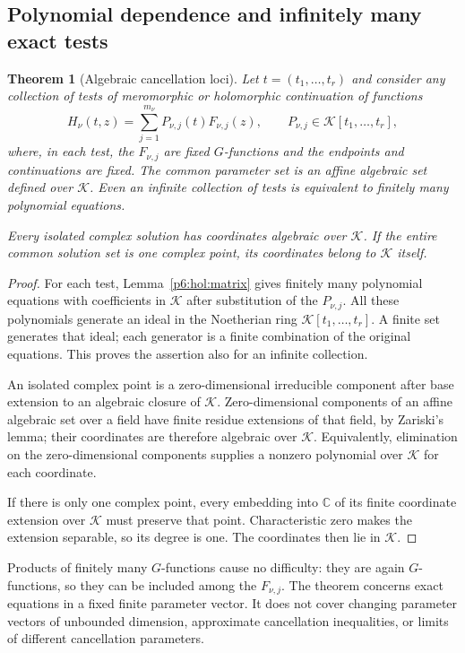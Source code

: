 \documentclass[11pt,a4paper]{article}
\newtheorem{theorem}{Theorem}[section]
\theoremstyle{definition}
\theoremstyle{remark}
\numberwithin{equation}{section}
\begin{document}
\subsection{Polynomial dependence and infinitely many exact tests}

\begin{theorem}[Algebraic cancellation loci]\label{p6:hol:polynomial}
Let $t=(t_1,\ldots,t_r)$ and consider any collection of tests of
meromorphic or holomorphic continuation of functions
\[
 H_\nu(t,z)=\sum_{j=1}^{m_\nu}P_{\nu,j}(t)F_{\nu,j}(z),
 \qquad P_{\nu,j}\in\mathcal K[t_1,\ldots,t_r],
\]
where, in each test, the $F_{\nu,j}$ are fixed $G$-functions and
the endpoints and continuations are fixed.  The common parameter
set is an affine algebraic set defined over $\mathcal K$.
Even an infinite collection of tests is equivalent to finitely
many polynomial equations.

Every isolated complex solution has coordinates algebraic over
$\mathcal K$.  If the entire common solution set is one complex
point, its coordinates belong to $\mathcal K$ itself.
\end{theorem}
\begin{proof}
For each test, Lemma~\ref{p6:hol:matrix} gives finitely many polynomial
equations with coefficients in $\mathcal K$ after substitution
of the $P_{\nu,j}$.  All these polynomials generate an ideal in
the Noetherian ring $\mathcal K[t_1,\ldots,t_r]$.
A finite set generates that ideal; each generator is a finite
combination of the original equations.  This proves the assertion
also for an infinite collection.

An isolated complex point is a zero-dimensional irreducible
component after base extension to an algebraic closure of
$\mathcal K$.  Zero-dimensional components of an affine
algebraic set over a field have finite residue extensions of
that field, by Zariski's lemma; their coordinates are therefore
algebraic over $\mathcal K$.  Equivalently, elimination on the
zero-dimensional components supplies a nonzero polynomial over
$\mathcal K$ for each coordinate.

If there is only one complex point, every embedding into
$\mathbb C$ of its finite coordinate extension over $\mathcal K$
must preserve that point.  Characteristic zero makes the
extension separable, so its degree is one.  The coordinates
then lie in $\mathcal K$.
\end{proof}

Products of finitely many $G$-functions cause no difficulty: they
are again $G$-functions, so they can be included among the $F_{\nu,j}$.
The theorem concerns exact equations in a fixed finite parameter
vector.  It does not cover changing parameter vectors of unbounded
dimension, approximate cancellation inequalities, or limits of
different cancellation parameters.
\end{document}
